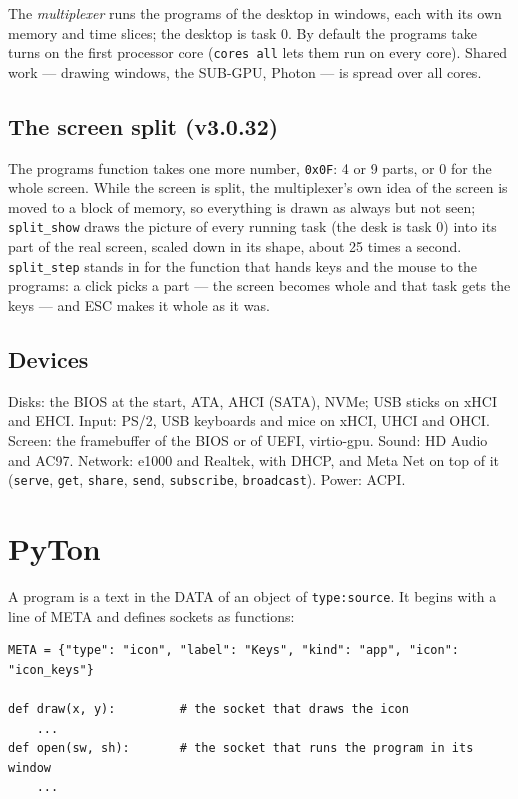 \documentclass[11pt,a4paper]{article}
\newcommand{\cmd}[1]{\texttt{#1}}
\begin{document}
The \emph{multiplexer} runs the programs of the desktop in windows, each with its own memory and
time slices; the desktop is task 0. By default the programs take turns on the first processor core
(\cmd{cores all} lets them run on every core). Shared work --- drawing windows, the SUB-GPU,
Photon --- is spread over all cores.

\subsection{The screen split (v3.0.32)}

The programs function takes one more number, \texttt{0x0F}: 4 or 9 parts, or 0 for the whole
screen. While the screen is split, the multiplexer's own idea of the screen is moved to a block
of memory, so everything is drawn as always but not seen; \texttt{split\_show} draws the
picture of every running task (the desk is task 0) into its part of the real screen, scaled
down in its shape, about 25 times a second. \texttt{split\_step} stands in for the function
that hands keys and the mouse to the programs: a click picks a part --- the screen becomes
whole and that task gets the keys --- and ESC makes it whole as it was.

\subsection{Devices}

Disks: the BIOS at the start, ATA, AHCI (SATA), NVMe; USB sticks on xHCI and EHCI. Input: PS/2,
USB keyboards and mice on xHCI, UHCI and OHCI. Screen: the framebuffer of the BIOS or of UEFI,
virtio-gpu. Sound: HD Audio and AC97. Network: e1000 and Realtek, with DHCP, and Meta Net on top
of it (\cmd{serve}, \cmd{get}, \cmd{share}, \cmd{send}, \cmd{subscribe}, \cmd{broadcast}).
Power: ACPI.

\section{PyTon}

A program is a text in the DATA of an object of \texttt{type:source}. It begins with a line of
META and defines sockets as functions:

\begin{verbatim}
META = {"type": "icon", "label": "Keys", "kind": "app", "icon": "icon_keys"}

def draw(x, y):         # the socket that draws the icon
    ...
def open(sw, sh):       # the socket that runs the program in its window
    ...
\end{verbatim}
\end{document}
